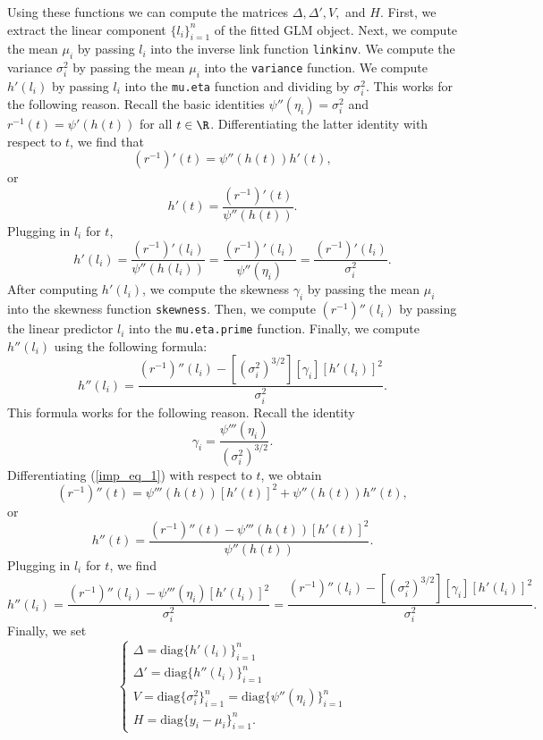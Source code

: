 \documentclass[12pt]{article}
\begin{document}
Using these functions we can compute the matrices $\Delta, \Delta', V,$ and $H$. First, we extract the linear component $\{l_i\}_{i=1}^n$ of the fitted GLM object. Next, we compute the mean $\mu_i$ by passing $l_i$ into the inverse link function \texttt{linkinv}. We compute the variance $\sigma_i^2$ by passing the mean $\mu_i$ into the \texttt{variance} function. We compute $h'(l_i)$ by passing $l_i$ into the \texttt{mu.eta} function and dividing by $\sigma_i^2$. This works for the following reason. Recall the basic identities $\psi''(\eta_i) = \sigma^2_i$ and $ r^{-1}(t) = \psi'(h(t))$ for all $t \in \R$. Differentiating the latter identity with respect to $t$, we find that 
\begin{equation}\label{imp_eq_1}
(r^{-1})'(t) = \psi''(h(t))h'(t), 
\end{equation}
or 
$$h'(t) = \frac{ (r^{-1})'(t) }{ \psi''(h(t))}.$$ Plugging in $l_i$ for $t$,
$$ h'(l_i) = \frac{ (r^{-1})'(l_i) }{ \psi''(h(l_i))} = \frac{(r^{-1})'(l_i)}{ \psi''( \eta_i ) } = \frac{ (r^{-1})'(l_i) }{ \sigma_i^2 }.$$
After computing $h'(l_i)$, we compute the skewness $\gamma_i$ by passing the mean $\mu_i$ into the skewness function \texttt{skewness}. Then, we compute $(r^{-1})''(l_i)$ by passing the linear predictor $l_i$ into the \texttt{mu.eta.prime} function. Finally, we compute $h''(l_i)$ using the following formula:
$$ h''(l_i) = \frac{(r^{-1})''(l_i)- [(\sigma_i^2)^{3/2} ] [\gamma_i] [h'(l_i)]^2 }{ \sigma_i^2}.$$ This formula works for the following reason. Recall the identity $$ \gamma_i = \frac{\psi'''(\eta_i)}{ (\sigma_i^2)^{3/2}}.$$ Differentiating (\ref{imp_eq_1}) with respect to $t$, we obtain
$$ (r^{-1})''(t) = \psi'''(h(t)) [h'(t)]^2 + \psi''(h(t)) h''(t),$$ or $$ h''(t) =\frac{(r^{-1})''(t) - \psi'''(h(t))[h'(t)]^2 }{ \psi''(h(t))}.$$ Plugging in $l_i$ for $t$, we find
$$
h''(l_i) = \frac{ (r^{-1})''(l_i) - \psi'''(\eta_i) [h'(l_i)]^2 }{ \sigma_i^2 } = \frac{ (r^{-1})''(l_i) - [ (\sigma_i^2)^{3/2}] [\gamma_i] [h'(l_i)]^2 }{ \sigma_i^2 }.
$$
Finally, we set $$\begin{cases} \Delta = \textrm{diag}\{ h'(l_i) \}_{i=1}^n \\ \Delta' = \textrm{diag}\{ h''(l_i) \}_{i=1}^n \\ V = \textrm{diag}\{ \sigma_i^2 \}_{i=1}^n = \textrm{diag} \{ \psi''(\eta_i) \}_{i=1}^n\\ H = \textrm{diag} \{y_i -\mu_i\}_{i=1}^n.\end{cases}$$

\end{document}
